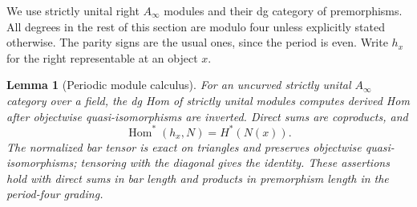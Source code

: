\documentclass[11pt]{article}
\newtheorem{lemma}[theorem]{Lemma}
\theoremstyle{definition}
\theoremstyle{remark}
\numberwithin{equation}{section}
\begin{document}
We use strictly unital right $A_\infty$ modules and their dg category
of premorphisms.  All degrees in the rest of this section are modulo
four unless explicitly stated otherwise.  The parity signs are the
usual ones, since the period is even.  Write $h_x$ for the right
representable at an object $x$.

\begin{lemma}[Periodic module calculus]
\label{per:module-calculus}
For an uncurved strictly unital $A_\infty$ category over a field,
the dg Hom of strictly unital modules computes
derived Hom after objectwise quasi-isomorphisms are inverted.  Direct
sums are coproducts, and
\[
 \operatorname{Hom}^*(h_x,N)=H^*(N(x)).
\]
The normalized bar tensor is exact on triangles and preserves
objectwise quasi-isomorphisms; tensoring with the diagonal gives the
identity.  These assertions hold with direct sums in bar length and
products in premorphism length in the period-four grading.
\end{lemma}
\end{document}
